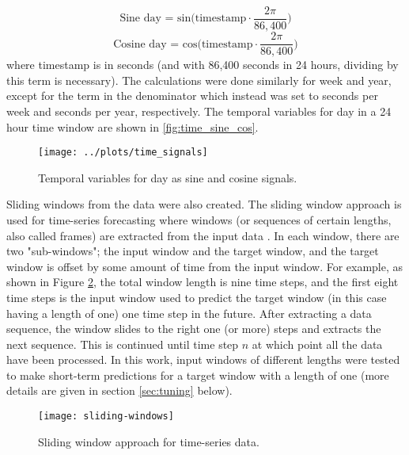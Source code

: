 $$ \text{Sine day = sin} \Big (\text{timestamp} \cdot \frac{2\pi}{86,400} \Big)$$
$$ \text{Cosine day = cos} \Big (\text{timestamp} \cdot \frac{2\pi}{86,400} \Big)$$
where timestamp is in seconds (and with 86,400 seconds in 24 hours, dividing by this term is necessary). The calculations were done similarly for week and year, except for the term in the denominator which instead was set to seconds per week and seconds per year, respectively. 
The temporal variables for day in a 24 hour time window are shown in \vref{fig:time_sine_cos}.

\begin{figure}[h] 
\begin{center}
\texttt{[image: ../plots/time\_signals]}
\caption{Temporal variables for day as sine and cosine signals.}
\label{fig:time_sine_cos}
\end{center}
\end{figure}

Sliding windows from the data were also created. The sliding window approach is used for time-series forecasting where windows (or sequences of certain lengths, also called frames) are extracted from the input data \cite{Arsov2021, Gilik2021}. In each window, there are two "sub-windows"; the input window and the target window, and the target window is offset by some amount of time from the input window. For example, as shown in Figure \ref{fig:sliding-window}, the total window length is nine time steps, and the first eight time steps is the input window used to predict the target window (in this case having a length of one) one time step in the future. After extracting a data sequence, the window slides to the right one (or more) steps and extracts the next sequence. This is continued until time step $n$ at which point all the data have been processed. 
In this work, input windows of different lengths were tested to make short-term predictions for a target window with a length of one (more details are given in section \ref{sec:tuning} below). 

 \begin{figure}[h]
\begin{center}
\texttt{[image: sliding-windows]}
\caption{Sliding window approach for time-series data.}
\label{fig:sliding-window}
\end{center}
\end{figure}

